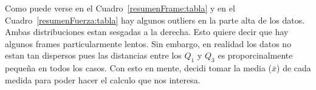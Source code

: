Como puede verse en el Cuadro~\ref{resumenFrame:tabla} y en el Cuadro~\ref{resumenFuerza:tabla} hay algunos outliers en la parte alta de los datos.
Ambas distribuciones estan sesgadas a la derecha.
Esto quiere decir que hay algunos frames particularmente lentos.
Sin embargo, en realidad los datos no estan tan dispersos pues las distancias entre los $Q_1$ y $Q_3$ es proporcinalmente pequeña en todos los casos.
Con esto en mente, decidi tomar la media ($\bar{x}$) de cada medida para poder hacer el calculo que nos interesa.
